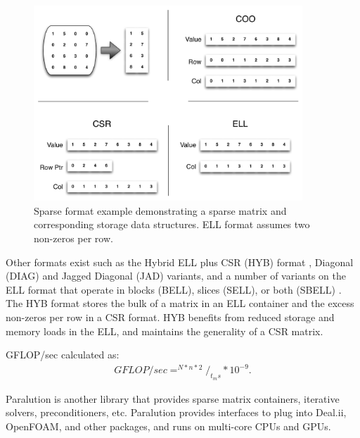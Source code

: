 \documentclass{report}
\begin{document}
\begin{figure}
\centering
\includegraphics[width=0.9\textwidth]{gpu_content/omnigraffle/SparseStorage.pdf}
\caption{Sparse format example demonstrating a sparse matrix and corresponding storage data structures. ELL format assumes two non-zeros per row. }
\label{fig:sparse_format}
\end{figure}

Other formats exist such as the Hybrid ELL plus CSR (HYB) format \cite{Bell2009}, Diagonal (DIAG) and Jagged Diagonal (JAD) variants, and a number of variants on the ELL format that operate in blocks (BELL), slices (SELL), or both (SBELL) \cite{SuKeutzer2012}. The HYB format stores the bulk of a matrix in an ELL container and the excess non-zeros per row in a CSR format. HYB benefits from reduced storage and memory loads in the ELL, and maintains the generality of a CSR matrix. 


GFLOP/sec calculated as: 
\begin{align}
GFLOP/sec = ^{N * n * 2} /_{t_ms} * 10^{-9}. 
\end{align}



Paralution is another library that provides sparse matrix containers, iterative solvers, preconditioners, etc. Paralution provides interfaces to plug into Deal.ii, OpenFOAM, and other packages, and runs on multi-core CPUs and GPUs. 
\end{document}
